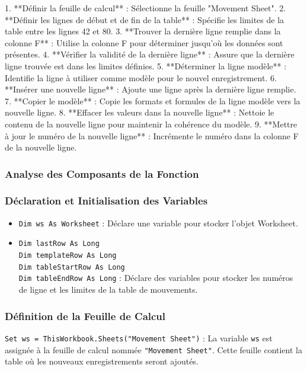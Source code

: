 \documentclass[a4paper, oneside, 12pt, final]{extreport}
\begin{document}
1. **Définir la feuille de calcul** : Sélectionne la feuille "Movement Sheet".
2. **Définir les lignes de début et de fin de la table** : Spécifie les limites de la table entre les lignes 42 et 80.
3. **Trouver la dernière ligne remplie dans la colonne F** : Utilise la colonne F pour déterminer jusqu'où les données sont présentes.
4. **Vérifier la validité de la dernière ligne** : Assure que la dernière ligne trouvée est dans les limites définies.
5. **Déterminer la ligne modèle** : Identifie la ligne à utiliser comme modèle pour le nouvel enregistrement.
6. **Insérer une nouvelle ligne** : Ajoute une ligne après la dernière ligne remplie.
7. **Copier le modèle** : Copie les formats et formules de la ligne modèle vers la nouvelle ligne.
8. **Effacer les valeurs dans la nouvelle ligne** : Nettoie le contenu de la nouvelle ligne pour maintenir la cohérence du modèle.
9. **Mettre à jour le numéro de la nouvelle ligne** : Incrémente le numéro dans la colonne F de la nouvelle ligne.

\subsubsection{Analyse des Composants de la Fonction}

\subsubsection{Déclaration et Initialisation des Variables}

\begin{itemize}
    \item \texttt{Dim ws As Worksheet} : Déclare une variable pour stocker l'objet Worksheet.
    \item \texttt{Dim lastRow As Long} \\
          \texttt{Dim templateRow As Long} \\
          \texttt{Dim tableStartRow As Long} \\
          \texttt{Dim tableEndRow As Long} : Déclare des variables pour stocker les numéros de ligne et les limites de la table de mouvements.
\end{itemize}

\subsubsection{Définition de la Feuille de Calcul}

\texttt{Set ws = ThisWorkbook.Sheets("Movement Sheet")} : La variable \texttt{ws} est assignée à la feuille de calcul nommée \texttt{"Movement Sheet"}. Cette feuille contient la table où les nouveaux enregistrements seront ajoutés.
\end{document}
